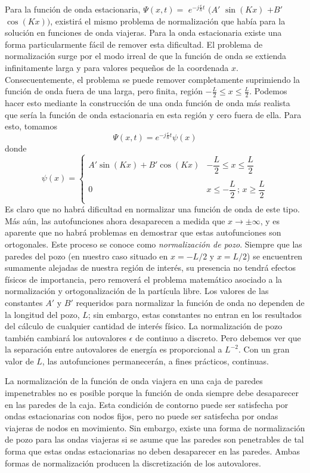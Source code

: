 \documentclass[12pt,a4paper]{article}
\def\e{{\epsilon}} %
\begin{document}
Para la función de onda estacionaria, $\Psi (x,t)=$ $e^{-j\frac{\e}{\hbar}t}$ $(A'$ $\sin(Kx)$ $+B'$ $\cos(Kx))$, existirá el mismo problema de normalización que había para la solución en funciones de onda viajeras. Para la onda estacionaria existe una forma particularmente fácil de remover esta dificultad. El problema de normalización surge por el modo irreal de que la función de onda se extienda infinitamente larga y para valores pequeños de la coordenada $x$. Consecuentemente, el problema se puede remover completamente suprimiendo la función de onda fuera de una larga, pero finita, región $-\frac{L}{2} \leq x \leq \frac{L}{2}$. Podemos hacer esto mediante la construcción de una onda función de onda más realista que sería la función de onda estacionaria en esta región y cero fuera de ella. Para esto, tomamos
\[ \Psi (x,t)=e^{-j\frac{\e}{\hbar}t}\psi (x) \]
donde
\[ \psi(x)=
\left\{
\begin{array}{ll}
A' \sin (Kx)+B' \cos(Kx) & -\dfrac{L}{2} \leq x \leq \dfrac{L}{2} \\
 & \\
0 & x \leq -\dfrac{L}{2} \, ; \, x \geq \dfrac{L}{2} \\
\end{array}
\right. \]
Es claro que no habrá dificultad en normalizar una función de onda de este tipo. Más aún, las autofunciones ahora desaparecen a medida que $x\rightarrow \pm \infty$, y es aparente que no habrá problemas en demostrar que estas autofunciones son ortogonales. Este proceso se conoce como \emph{normalización de pozo}. Siempre que las paredes del pozo (en nuestro caso situado en $x=-L/2$ y $x=L/2$) se encuentren sumamente alejadas de nuestra región de interés, su presencia no tendrá efectos físicos de importancia, pero removerá el problema matemático asociado a la normalización y ortogonalización de la partícula libre. Los valores de las constantes $A'$ y $B'$ requeridos para normalizar la función de onda no dependen de la longitud del pozo, $L$; sin embargo, estas constantes no entran en los resultados del cálculo de cualquier cantidad de interés físico. La normalización de pozo también cambiará los autovalores $\e$ de continuo a discreto. Pero debemos ver que la separación entre autovalores de energía es proporcional a $L^{-2}$. Con un gran valor de $L$, las autofunciones permanecerán, a fines prácticos, continuas.

La normalización de la función de onda viajera en una caja de paredes impenetrables no es posible porque la función de onda siempre debe desaparecer en las paredes de la caja. Esta condición de contorno puede ser satisfecha por ondas estacionarias con nodos fijos, pero no puede ser satisfecha por ondas viajeras de nodos en movimiento. Sin embargo, existe una forma de normalización de pozo para las ondas viajeras si se asume que las paredes son penetrables de tal forma que estas ondas estacionarias no deben desaparecer en las paredes. Ambas formas de normalización producen la discretización de los autovalores.
\end{document}
